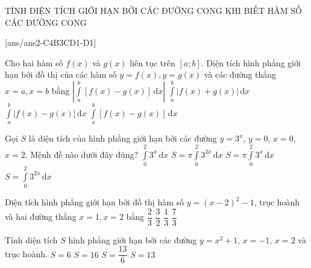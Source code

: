 \begin{dang}
	{TÍNH DIỆN TÍCH GIỚI HẠN BỞI CÁC ĐƯỜNG CONG KHI BIẾT HÀM SỐ CÁC ĐƯỜNG CONG}\end{dang}
\TN
{}[ans/ans2-C4B3CD1-D1]
\begin{ex}%
	Cho hai hàm số $f(x)$ và $g(x)$ liên tục trên $[a;b]$. Diện tích hình phẳng giới hạn bởi đồ thị của các hàm số $y=f(x), y=g(x)$ và các đường thẳng $x=a, x=b$ bằng
\choice
{$\left|\displaystyle\int\limits_a^b \left[f(x)-g(x)\right]\mathrm{\,d}x\right|$}
{$\displaystyle\int\limits_a^b \left|f(x)+g(x)\right|\mathrm{\,d}x$}
{\True $\displaystyle\int\limits_a^b \left|f(x)-g(x)\right|\mathrm{\,d}x$}
{$\displaystyle\int\limits_a^b \left[f(x)-g(x)\right]\mathrm{\,d}x$}
\end{ex}
\begin{ex}%
	Gọi $S$ là diện tích của hình phẳng giới hạn bởi các đường $y=3^x$, $y=0$, $x=0$, $x=2$. Mệnh đề nào dưới đây đúng?
\choice
{\True $\displaystyle\int\limits_0^2 3^x\mathrm{\,d}x$}
{$S=\pi\displaystyle\int\limits_0^2 3^{2x}\mathrm{\,d}x$}
{$S=\pi\displaystyle\int\limits_0^2 3^x\mathrm{\,d}x$}
{$S=\displaystyle\int\limits_0^2 3^{2x}\mathrm{\,d}x$}

\end{ex}%
\begin{ex}%
	Diện tích hình phẳng giới hạn bởi đồ thị hàm số $y=(x-2)^2-1$, trục hoành và hai đường thẳng $x=1, x=2$ bằng
\choice
{\True $\dfrac{2}{3}$}
{$\dfrac{3}{2}$}
{$\dfrac{1}{3}$}
{$\dfrac{7}{3}$}

\end{ex}
\begin{ex}%
	Tính diện tích $S$ hình phẳng giới hạn bởi các đường $y=x^2+1$, $x=-1$, $x=2$ và trục hoành.
\choice
{\True $S=6$}
{$S=16$}
{$S=\dfrac{13}{6}$}
{$S=13$}
\end{ex}

